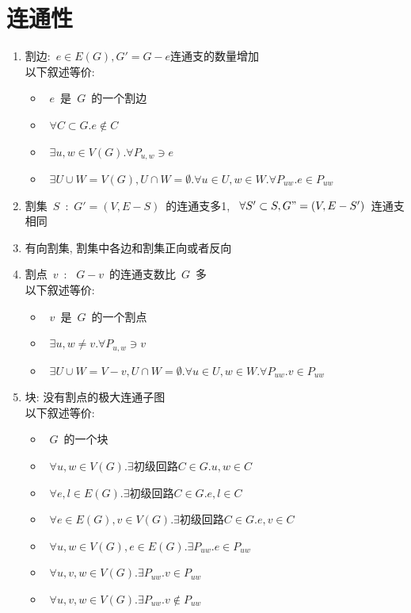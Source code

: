 \documentclass[11pt,a4paper]{article}%
\renewcommand{\[}{~$}
\renewcommand{\]}{$~}%
\begin{document}
\section{连通性}
	\begin{enumerate}
	 \item 割边:\[e\in E(G), G' = G-e\mbox{连通支的数量增加}\]\\
	 	以下叙述等价:
	 	\begin{itemize}
	 	 \item \[e\]是\[G\]的一个割边
	 	 \item \[\forall C\subset G. e\notin C\]
	 	 \item \[\exists u,w \in V(G). \forall P_{u,w}\ni e\]
	 	 \item \[\exists U \cup W = V(G), U \cap W = \emptyset. \forall u\in U, w\in W. \forall P_{uw}. e\in P_{uw}\]
	 	\end{itemize}
	 \item 割集\[S\]:\[G'=(V, E-S)\]的连通支多1, \[\forall S' \subset S, G" = (V, E-S')\]连通支相同
	 \item 有向割集, 割集中各边和割集正向或者反向
	 \item 割点\[v\]: \[G-v\]的连通支数比\[G\]多\\
	 	以下叙述等价:
	 	\begin{itemize}
	 	 \item \[v\]是\[G\]的一个割点
	 	 \item \[\exists u,w \neq v. \forall P_{u,w}\ni v\]
	 	 \item \[\exists U \cup W = V -v, U \cap W = \emptyset. \forall u\in U, w\in W. \forall P_{uw}. v\in P_{uw}\]
	 	\end{itemize}
	 \item 块: 没有割点的极大连通子图\\
	 	以下叙述等价:
	 	\begin{itemize}
	 	 \item \[G\]的一个块
	 	 \item \[\forall u,w \in V(G). \exists \mbox{初级回路}C\in G. u,w\in C\]
	 	 \item \[\forall e,l \in E(G). \exists \mbox{初级回路}C\in G. e,l\in C\]
	 	 \item \[\forall e\in E(G), v\in V(G). \exists \mbox{初级回路}C\in G. e,v\in C\]
	 	 \item \[\forall u,w\in V(G), e\in E(G).\exists P_{uw}.e\in P_{uw} \]
	 	 \item \[\forall u,v,w\in V(G). \exists P_{uw}. v\in P_{uw}\]
	 	 \item \[\forall u,v,w\in V(G). \exists P_{uw}. v\notin P_{uw}\]

\end{itemize}
\end{enumerate}
\end{document}
